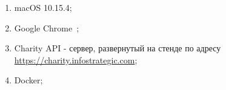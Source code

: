 \begin{enumerate}
        \item macOS 10.15.4;
        \item Google Chrome~\cite{chrome};
        \item Charity API - сервер, развернутый на стенде по адресу \url{https://charity.infostrategic.com};
        \item Docker;
\end{enumerate}